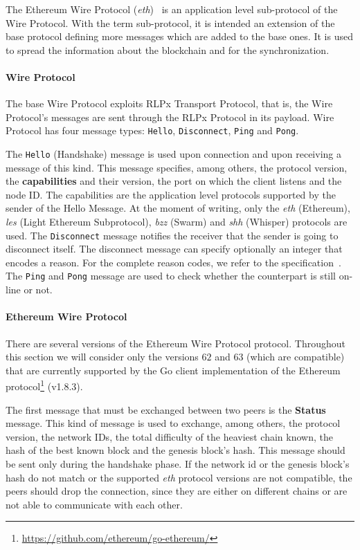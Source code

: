 The Ethereum Wire Protocol (\emph{eth})~\cite{bib:ethereumwireprotocol}  is an
application level sub-protocol of the \devpp{} Wire Protocol. With the term
sub-protocol, it is intended an extension of the base protocol defining more
messages which are added to the base ones. It is used to spread the information
about the blockchain and for the synchronization.

\paragraph{\devpp{} Wire Protocol}
The base \devpp{} Wire Protocol exploits RLPx Transport Protocol, that is, the
\devpp{} Wire Protocol's messages are sent through the RLPx Protocol in its
payload. \devpp{} Wire Protocol has four message types: \verb+Hello+,
\verb+Disconnect+, \verb+Ping+ and \verb+Pong+.

The \verb+Hello+ (Handshake) message is used upon connection and upon receiving
a message of this kind. This message specifies, among others, the protocol
version, the \textbf{capabilities} and their version, the port on which the
client listens and the node ID. The capabilities are the application level
protocols supported by the sender of the Hello Message. At the moment of
writing, only the \emph{eth} (Ethereum), \emph{les} (Light Ethereum
Subprotocol), \emph{bzz} (Swarm) and \emph{shh} (Whisper) protocols are used.
The \verb+Disconnect+ message notifies the receiver that the sender is going to
disconnect itself. The disconnect message can specify optionally an integer that
encodes a reason. For the complete reason codes, we refer to the \devpp{}
specification~\cite{devp2pwire}. The \verb+Ping+ and \verb+Pong+ message are
used to check whether the counterpart is still on-line or not.

\paragraph{Ethereum Wire Protocol}
There are several versions of the Ethereum Wire Protocol protocol. Throughout
this section we will consider only the versions $62$ and $63$ (which are
compatible) that are currently supported by the Go client implementation of the
Ethereum protocol\footnote{\url{https://github.com/ethereum/go-ethereum/}}
(v1.8.3).

The first message that must be exchanged between two peers is the
\textbf{Status} message. This kind of message is used to exchange, among others,
the protocol version, the network IDs, the total difficulty of the heaviest
chain known, the hash of the best known block and the genesis block's hash. This
message should be sent only during the handshake phase. If the network id or the
genesis block's hash do not match or the supported \emph{eth} protocol versions
are not compatible, the peers should drop the connection, since they are either
on different chains or are not able to communicate with each other.

